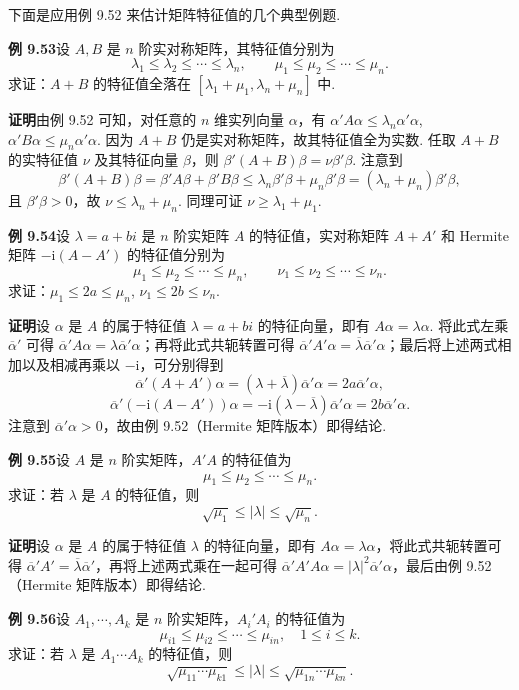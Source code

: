 \documentclass[UTF8, 12pt, fontset=fandol, oneside]{ctexart}
\begin{document}
下面是应用例 9.52 来估计矩阵特征值的几个典型例题.

\noindent\textbf{例 9.53}\quad 设 $A,B$ 是 $n$ 阶实对称矩阵，其特征值分别为
\[
\lambda_1\le\lambda_2\le\cdots\le\lambda_n,\qquad
\mu_1\le\mu_2\le\cdots\le\mu_n.
\]
求证：$A+B$ 的特征值全落在 $[\lambda_1+\mu_1,\lambda_n+\mu_n]$ 中.

\noindent\textbf{证明}\quad 由例 9.52 可知，对任意的 $n$ 维实列向量 $\alpha$，有 $\alpha'A\alpha\le\lambda_n\alpha'\alpha$, $\alpha'B\alpha\le\mu_n\alpha'\alpha$. 因为 $A+B$ 仍是实对称矩阵，故其特征值全为实数. 任取 $A+B$ 的实特征值 $\nu$ 及其特征向量 $\beta$，则 $\beta'(A+B)\beta=\nu\beta'\beta$. 注意到
\[
\beta'(A+B)\beta=\beta'A\beta+\beta'B\beta\le\lambda_n\beta'\beta+\mu_n\beta'\beta=(\lambda_n+\mu_n)\beta'\beta,
\]
且 $\beta'\beta>0$，故 $\nu\le\lambda_n+\mu_n$. 同理可证 $\nu\ge\lambda_1+\mu_1$.

\noindent\textbf{例 9.54}\quad 设 $\lambda=a+bi$ 是 $n$ 阶实矩阵 $A$ 的特征值，实对称矩阵 $A+A'$ 和 Hermite 矩阵 $-\mathrm{i}(A-A')$ 的特征值分别为
\[
\mu_1\le\mu_2\le\cdots\le\mu_n,\qquad \nu_1\le\nu_2\le\cdots\le\nu_n.
\]
求证：$\mu_1\le2a\le\mu_n$, $\nu_1\le2b\le\nu_n$.

\noindent\textbf{证明}\quad 设 $\alpha$ 是 $A$ 的属于特征值 $\lambda=a+bi$ 的特征向量，即有 $A\alpha=\lambda\alpha$. 将此式左乘 $\overline{\alpha}'$ 可得 $\overline{\alpha}'A\alpha=\lambda\overline{\alpha}'\alpha$；再将此式共轭转置可得 $\overline{\alpha}'A'\alpha=\overline{\lambda}\overline{\alpha}'\alpha$；最后将上述两式相加以及相减再乘以 $-\mathrm{i}$，可分别得到
\[
\overline{\alpha}'(A+A')\alpha=(\lambda+\overline{\lambda})\overline{\alpha}'\alpha=2a\overline{\alpha}'\alpha,
\]
\[
\overline{\alpha}'(-\mathrm{i}(A-A'))\alpha=-\mathrm{i}(\lambda-\overline{\lambda})\overline{\alpha}'\alpha=2b\overline{\alpha}'\alpha.
\]
注意到 $\overline{\alpha}'\alpha>0$，故由例 9.52（Hermite 矩阵版本）即得结论.

\noindent\textbf{例 9.55}\quad 设 $A$ 是 $n$ 阶实矩阵，$A'A$ 的特征值为
\[
\mu_1\le\mu_2\le\cdots\le\mu_n.
\]
求证：若 $\lambda$ 是 $A$ 的特征值，则
\[
\sqrt{\mu_1}\le|\lambda|\le\sqrt{\mu_n}.
\]

\noindent\textbf{证明}\quad 设 $\alpha$ 是 $A$ 的属于特征值 $\lambda$ 的特征向量，即有 $A\alpha=\lambda\alpha$，将此式共轭转置可得 $\overline{\alpha}'A'=\overline{\lambda}\overline{\alpha}'$，再将上述两式乘在一起可得 $\overline{\alpha}'A'A\alpha=|\lambda|^2\overline{\alpha}'\alpha$，最后由例 9.52（Hermite 矩阵版本）即得结论.

\noindent\textbf{例 9.56}\quad 设 $A_1,\cdots,A_k$ 是 $n$ 阶实矩阵，$A_i'A_i$ 的特征值为
\[
\mu_{i1}\le\mu_{i2}\le\cdots\le\mu_{in},\quad 1\le i\le k.
\]
求证：若 $\lambda$ 是 $A_1\cdots A_k$ 的特征值，则
\[
\sqrt{\mu_{11}\cdots\mu_{k1}}\le|\lambda|\le\sqrt{\mu_{1n}\cdots\mu_{kn}}.
\]
\end{document}
